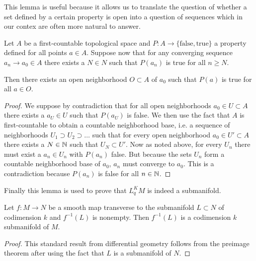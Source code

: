 This lemma is useful because it allows us to translate the question of whether a set defined by a certain property is open into a question of sequences which in our contex are often more natural to answer.
\begin{lemma}\label{lem:firstcount}
    Let $A$ be a first-countable topological space and $P:A\to \{\text{false},\text{true}\}$ a property defined for all points $a\in A$. Suppose now that for any converging sequence $a_n\to a_0\in A$ there exists a $N\in N$ such that $P(a_n)$ is true for all $n\ge N$.
    
    Then there exists an open neighborhood $O\subset A$ of $a_0$ such that $P(a)$ is true for all $a\in O$.
\end{lemma}
\begin{proof}
    We suppose by contradiction that for all open neighborhoods $a_0\in U \subset A$ there exists a $a_U\in U$ such that $P(a_U)$ is false. We then use the fact that $A$ is first-countable to obtain a countable neighborhood base, i.e. a sequence of neighborhoods $U_1\supset U_2 \supset \dots$ such that for every open neighborhood $a_0\in U' \subset A$ there exists a $N\in \mathbb{N}$ such that $U_N\subset U'$. Now as noted above, for every $U_n$ there must exist a $a_n\in U_n$ with $P(a_n)$ false. But because the sets $U_n$ form a countable neighborhood base of $a_0$, $a_n$ must converge to $a_0$. This is a contradiction because $P(a_n)$ is false for all $n\in \mathbb{N}$.
\end{proof}

Finally this lemma is used to prove that $L^K_qM$ is indeed a submanifold.
\begin{lemma}\label{lem:transmap}
    Let $f:M\to N$ be a smooth map transverse to the submanifold $L\subset N$ of codimension $k$ and $f^{-1}(L)$ is nonempty.
    Then $f^{-1}(L)$ is a codimension $k$ submanifold of $M$.
\end{lemma}
\begin{proof}
    This standard result from differential geometry follows from the preimage theorem after using the fact that $L$ is a submanifold of $N$.
\end{proof}
